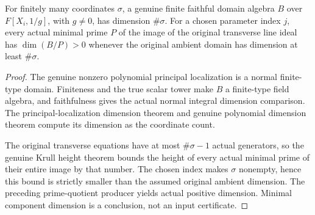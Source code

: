 \begin{theorem}
\label{algebra:line-component-positive-dimension}
\leanok
{}
For finitely many coordinates $\sigma$, a genuine finite faithful domain
algebra $B$ over $F[X_i,1/g]$, with $g\ne0$, has dimension
$\#\sigma$. For a chosen parameter index $j$, every actual minimal
prime $P$ of the image of the original transverse line ideal has
$\dim(B/P)>0$ whenever the original ambient domain has dimension at
least $\#\sigma$.
\end{theorem}
\begin{proof}
The genuine nonzero polynomial principal localization is a normal
finite-type domain. Finiteness and the true scalar tower make $B$ a
finite-type field algebra, and faithfulness gives the actual normal
integral dimension comparison. The principal-localization dimension
theorem and genuine polynomial dimension theorem compute its dimension
as the coordinate count.

The original transverse equations have at most $\#\sigma-1$ actual
generators, so the genuine Krull height theorem bounds the height of
every actual minimal prime of their entire image by that number. The
chosen index makes $\sigma$ nonempty, hence this bound is strictly
smaller than the assumed original ambient dimension. The preceding
prime-quotient producer yields actual positive dimension. Minimal
component dimension is a conclusion, not an input certificate.
\end{proof}

